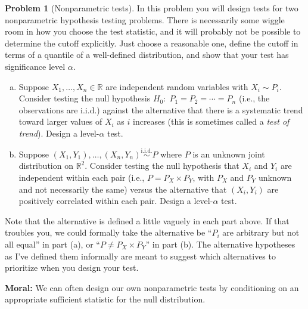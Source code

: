 \documentclass{article}
\newcommand{\RR}{\mathbb{R}}
\newcommand{\simiid}{\overset{\text{i.i.d.}}{\sim}}
\theoremstyle{definition}
\newtheorem{problem}{Problem}
\begin{document}
\begin{problem}[Nonparametric tests]
\label{prob:nonparametric-tests}
In this problem you will design tests for two nonparametric hypothesis testing problems. There is necessarily some wiggle room in how you choose the test statistic, and it will probably not be possible to determine the cutoff explicitly. Just choose a reasonable one, define the cutoff in terms of a quantile of a well-defined distribution, and show that your test has significance level $\alpha$.

\begin{enumerate}[(a)]
\item Suppose $X_1,\ldots,X_n\in \RR$ are independent random variables with $X_i \sim P_i$. Consider testing the null hypothesis $H_0:\; P_1=P_2=\cdots=P_n$ (i.e., the observations are i.i.d.) against the alternative that there is a systematic trend toward larger values of $X_i$ as $i$ increases (this is sometimes called a {\em test of trend}). Design a level-$\alpha$ test.



\item Suppose $(X_1,Y_1),\ldots,(X_n,Y_n) \simiid P$ where $P$ is an unknown joint distribution on $\RR^2$. Consider testing the null hypothesis that $X_i$ and $Y_i$ are independent within each pair (i.e., $P = P_X \times P_Y$, with $P_X$ and $P_Y$ unknown and not necessarily the same) versus the alternative that $(X_i,Y_i)$ are positively correlated within each pair. Design a level-$\alpha$ test.




\end{enumerate}

Note that the alternative is defined a little vaguely in each part above. If that troubles you, we could formally take the alternative be ``$P_i$ are arbitrary but not all equal'' in part (a), or ``$P \neq P_X \times P_Y$'' in part (b). The alternative hypotheses as I've defined them informally are meant to suggest which alternatives to prioritize when you design your test.

{\bf Moral:} We can often design our own nonparametric tests by conditioning on an appropriate sufficient statistic for the null distribution.
\end{problem}




\end{document}
